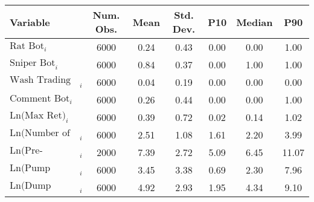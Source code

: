 \begin{tabular}{lcccccc}
\toprule
Variable & Num. Obs. & Mean & Std. Dev. & P10 & Median & P90 \\
\midrule
$\text{Rat Bot}_{i}$ & 6000 & 0.24 & 0.43 & 0.00 & 0.00 & 1.00 \\
$\text{Sniper Bot}_{i}$ & 6000 & 0.84 & 0.37 & 0.00 & 1.00 & 1.00 \\
$\text{Wash Trading Bot}_{i}$ & 6000 & 0.04 & 0.19 & 0.00 & 0.00 & 0.00 \\
$\text{Comment Bot}_{i}$ & 6000 & 0.26 & 0.44 & 0.00 & 0.00 & 1.00 \\
$\text{Ln(Max Ret)}_{i}$ & 6000 & 0.39 & 0.72 & 0.02 & 0.14 & 1.02 \\
$\text{Ln(Number of Traders)}_{i}$ & 6000 & 2.51 & 1.08 & 1.61 & 2.20 & 3.99 \\
$\text{Ln(Pre-Migration Duration)}_{i}$ & 2000 & 7.39 & 2.72 & 5.09 & 6.45 & 11.07 \\
$\text{Ln(Pump Duration)}_{i}$ & 6000 & 3.45 & 3.38 & 0.69 & 2.30 & 7.96 \\
$\text{Ln(Dump Duration)}_{i}$ & 6000 & 4.92 & 2.93 & 1.95 & 4.34 & 9.10 \\
\bottomrule
\end{tabular}